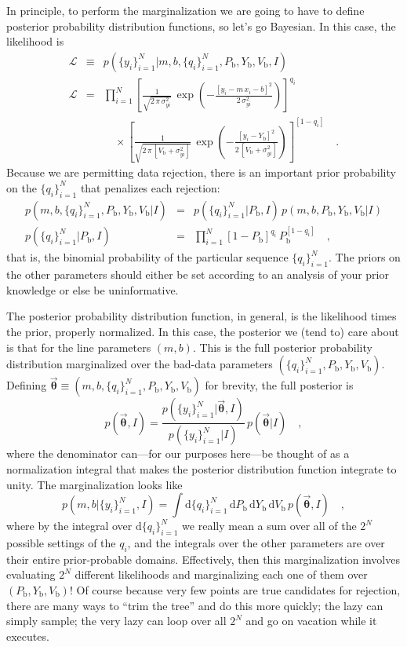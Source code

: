 \documentclass[12pt,twoside]{article}
\newcommand{\mmatrix}[1]{\boldsymbol{#1}}
\newcommand{\parametervector}[1]{\mmatrix{\vec{#1}}}
\newcommand{\pvtheta}{\parametervector{\theta}}
\newcommand{\setofall}[3]{\{{#1}\}_{{#2}}^{{#3}}}
\newcommand{\allq}{\setofall{q_i}{i=1}{N}}
\newcommand{\ally}{\setofall{y_i}{i=1}{N}}
\renewcommand{\d}{\mathrm{d}}
\newcommand{\like}{\mathscr{L}}
\newcommand{\Pbad}{P_{\mathrm{b}}}
\newcommand{\Ybad}{Y_{\mathrm{b}}}
\newcommand{\Vbad}{V_{\mathrm{b}}}
\begin{document}
In principle, to perform the marginalization we are going to have to
define posterior probability distribution functions, so let's go
Bayesian.  In this case, the likelihood is
\begin{eqnarray}\displaystyle
\like &\equiv& p(\ally|m,b,\allq,\Pbad,\Ybad,\Vbad,I)
 \nonumber\\
\like &=& \prod_{i=1}^N \left[\frac{1}{\sqrt{2\,\pi\,\sigma_{yi}^2}}
 \,\exp\left(-\frac{[y_i-m\,x_i-b]^2}{2\,\sigma_{yi}^2}\right)\right]^{q_i}
 \nonumber \\ & & \quad\times
 \left[\frac{1}{\sqrt{2\,\pi\,[\Vbad+\sigma_{yi}^2]}}
 \,\exp\left(-\frac{[y_i-\Ybad]^2}{2\,[\Vbad+\sigma_{yi}^2]}\right)\right]^{[1-q_i]}
 \quad .
\end{eqnarray}
Because we are permitting data rejection, there is an important prior
probability on the $\allq$ that penalizes each rejection:
\begin{eqnarray}\displaystyle
p(m,b,\allq,\Pbad,\Ybad,\Vbad|I)
 &=& p(\allq|\Pbad,I)\,p(m,b,\Pbad,\Ybad,\Vbad|I)
 \nonumber\\
p(\allq|\Pbad,I)
 &=& \prod_{i=1}^N[1-\Pbad]^{q_i}\,\Pbad^{[1-q_i]}
 \quad ,
\end{eqnarray}
that is, the binomial probability of the particular sequence $\allq$.
The priors on the other parameters should either be set according to
an analysis of your prior knowledge or else be uninformative.

The posterior probability distribution function, in general, is the
likelihood times the prior, properly normalized.  In this case, the
posterior we (tend to) care about is that for the line parameters
$(m,b)$.  This is the full posterior probability distribution
marginalized over the bad-data parameters $(\allq,\Pbad,\Ybad,\Vbad)$.
Defining $\pvtheta\equiv(m,b,\allq,\Pbad,\Ybad,\Vbad)$ for brevity, the
full posterior is
\begin{equation}
p(\pvtheta,I) =
 \frac{p(\ally|\pvtheta,I)}{p(\ally|I)}
 \,p(\pvtheta|I)
 \quad,
\end{equation}
where the denominator can---for our purposes here---be thought of as a
normalization integral that makes the posterior distribution function
integrate to unity.  The marginalization looks like
\begin{equation}
p(m,b|\ally,I)=\int \d\allq\,\d\Pbad\,\d\Ybad\,\d\Vbad
 \,p(\pvtheta,I) \quad,
\end{equation}
where by the integral over $\d\allq$ we really mean a sum over all of
the $2^N$ possible settings of the $q_i$, and the integrals over the
other parameters are over their entire prior-probable domains.
Effectively, then this marginalization involves evaluating $2^N$
different likelihoods and marginalizing each one of them over
$(\Pbad,\Ybad,\Vbad)$!  Of course because very few points are true
candidates for rejection, there are many ways to ``trim the tree'' and
do this more quickly; the lazy can simply sample; the very lazy can
loop over all $2^N$ and go on vacation while it executes.
  
\end{document}
